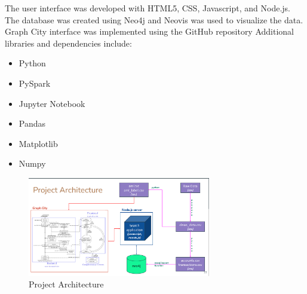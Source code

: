 \vspace{\baselineskip} 
\textnormal{
The user interface was developed with HTML5, CSS, Javascript, and Node.js. The database was created using Neo4j and Neovis was used to visualize the data. Graph City interface was implemented using the GitHub repository\cite{GraphCities}  Additional libraries and dependencies include:
}
\begin{itemize}
  \item Python
  \item PySpark
  \item Jupyter Notebook
  \item Pandas
  \item Matplotlib
  \item Numpy
\end{itemize}

\begin{figure}[htbp]
    \centering
    \includegraphics[width=8cm]{imgs/architecture.png}
    \caption{Project Architecture}
    \label{fig:Dataad}
\end{figure}

